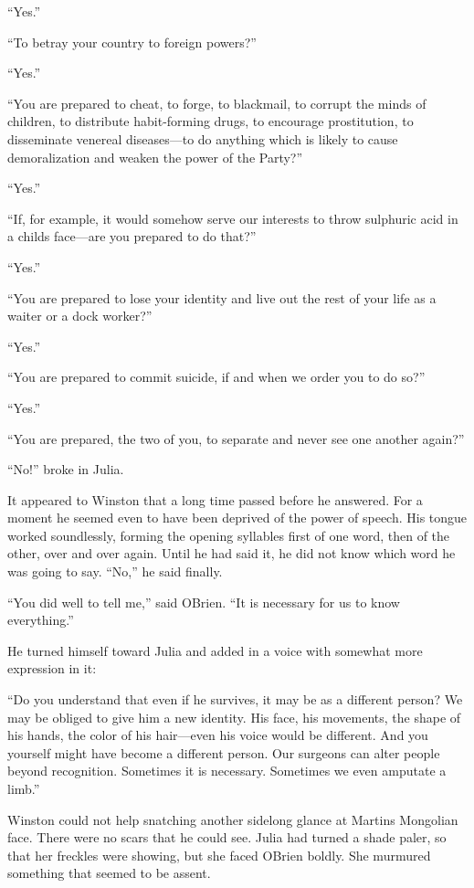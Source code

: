 ``Yes.''

``To betray your country to foreign powers?''

``Yes.''

``You are prepared to cheat, to forge, to blackmail, to corrupt the minds
of children, to distribute habit-forming drugs, to encourage
prostitution, to disseminate venereal diseases---to do anything which is
likely to cause demoralization and weaken the power of the Party?''

``Yes.''

``If, for example, it would somehow serve our interests to throw
sulphuric acid in a child\textquotesingle s face---are you prepared to
do that?''

``Yes.''

``You are prepared to lose your identity and live out the rest of your
life as a waiter or a dock worker?''

``Yes.''

``You are prepared to commit suicide, if and when we order you to do so?''

``Yes.''

``You are prepared, the two of you, to separate and never see one another
again?''

``No!'' broke in Julia.

It appeared to Winston that a long time passed before he answered. For a
moment he seemed even to have been deprived of the power of speech. His
tongue worked soundlessly, forming the opening syllables first of one
word, then of the other, over and over again. Until he had said it, he
did not know which word he was going to say. ``No,'' he said finally.

``You did well to tell me,'' said O\textquotesingle Brien. ``It is
necessary for us to know everything.''

He turned himself toward Julia and added in a voice with somewhat more
expression in it:

``Do you understand that even if he survives, it may be as a different
person? We may be obliged to give him a new identity. His face, his
movements, the shape of his hands, the color of his hair---even his
voice would be different. And you yourself might have become a different
person. Our surgeons can alter people beyond recognition. Sometimes it
is necessary. Sometimes we even amputate a limb.''

Winston could not help snatching another sidelong glance at
Martin\textquotesingle s Mongolian face. There were no scars that he
could see. Julia had turned a shade paler, so that her freckles were
showing, but she faced O\textquotesingle Brien boldly. She murmured
something that seemed to be assent.

